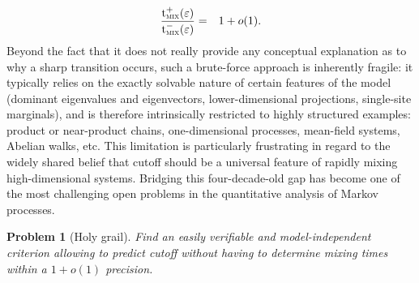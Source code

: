 \documentclass[12pt,final]{article}
\newtheorem{problem}{Problem}[section]
\numberwithin{equation}{section}
\newcommand{\tmix}{{\rm t}_{\textsc{mix}}}
\begin{document}
\begin{eqnarray}
\frac{\tmix^+(\varepsilon)}{\tmix^-(\varepsilon)} & = & 1+o(1).
\end{eqnarray}
Beyond the fact that it does not really provide any conceptual explanation as to why a sharp transition occurs, such a brute-force approach is inherently fragile: it typically relies on the exactly solvable nature of certain features of the model (dominant eigenvalues and eigenvectors, lower-dimensional projections, single-site marginals), and is therefore intrinsically restricted to highly structured examples: product or near-product chains,
one-dimensional processes, mean-field systems, Abelian walks, etc. This limitation is particularly
frustrating in regard to the widely shared belief that cutoff should be a universal
feature of rapidly mixing high-dimensional systems. Bridging this  four-decade-old gap has  become one of the most challenging open problems in the quantitative analysis of Markov processes.  
\begin{problem}[Holy grail]\label{pb:main}
Find an  easily verifiable and model-independent  criterion allowing to predict cutoff without having to determine mixing times within a $1+o(1)$ precision.
\end{problem}
\end{document}
